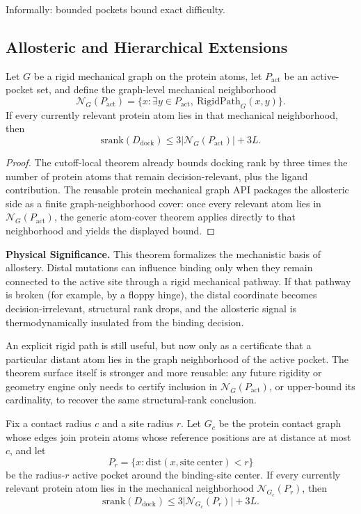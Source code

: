 Informally: bounded pockets bound exact difficulty.

\subsection{Allosteric and Hierarchical Extensions}

\begin{theorem}\label{thm:allosteric-srank-graph}
Let $G$ be a rigid mechanical graph on the protein atoms, let $P_{\mathrm{act}}$ be an active-pocket set, and define the graph-level mechanical neighborhood
\[
\mathcal{N}_G(P_{\mathrm{act}})
=
\{x : \exists y \in P_{\mathrm{act}},\ \mathrm{RigidPath}_G(x,y)\}.
\]
If every currently relevant protein atom lies in that mechanical neighborhood, then
\[
\mathrm{srank}(D_{\mathrm{dock}})
\le
3\bigl|\mathcal{N}_G(P_{\mathrm{act}})\bigr| + 3L.
\]
\end{theorem}

\begin{proof}
The cutoff-local theorem already bounds docking rank by three times the number of protein atoms that remain decision-relevant, plus the ligand contribution. The reusable protein mechanical graph API packages the allosteric side as a finite graph-neighborhood cover: once every relevant atom lies in $\mathcal{N}_G(P_{\mathrm{act}})$, the generic atom-cover theorem applies directly to that neighborhood and yields the displayed bound.
\end{proof}

\textbf{Physical Significance.} This theorem formalizes the mechanistic basis of allostery. Distal mutations can influence binding only when they remain connected to the active site through a rigid mechanical pathway. If that pathway is broken (for example, by a floppy hinge), the distal coordinate becomes decision-irrelevant, structural rank drops, and the allosteric signal is thermodynamically insulated from the binding decision.

An explicit rigid path is still useful, but now only as a certificate that a particular distant atom lies in the graph neighborhood of the active pocket. The theorem surface itself is stronger and more reusable: any future rigidity or geometry engine only needs to certify inclusion in $\mathcal{N}_G(P_{\mathrm{act}})$, or upper-bound its cardinality, to recover the same structural-rank conclusion.

\begin{theorem}\label{thm:geometric-contact-allostery}
Fix a contact radius $c$ and a site radius $r$. Let $G_c$ be the protein contact graph whose edges join protein atoms whose reference positions are at distance at most $c$, and let
\[
P_r=
\{x : \mathrm{dist}(x,\mathrm{site\ center}) < r\}
\]
be the radius-$r$ active pocket around the binding-site center. If every currently relevant protein atom lies in the mechanical neighborhood $\mathcal{N}_{G_c}(P_r)$, then
\[
\mathrm{srank}(D_{\mathrm{dock}})
\le
3\bigl|\mathcal{N}_{G_c}(P_r)\bigr| + 3L.
\]
\end{theorem}

